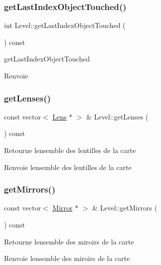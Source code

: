 \subsubsection{\texorpdfstring{getLastIndexObjectTouched()}{getLastIndexObjectTouched()}}
{\footnotesize\ttfamily int Level\+::get\+Last\+Index\+Object\+Touched (\begin{DoxyParamCaption}{ }\end{DoxyParamCaption}) const}



get\+Last\+Index\+Object\+Touched 

\begin{DoxyReturn}{Renvoie}

\end{DoxyReturn}
\mbox{\label{class_level_a38b9b969eb86aaea2824666960f797b7}} 
\subsubsection{\texorpdfstring{getLenses()}{getLenses()}}
{\footnotesize\ttfamily const vector$<$ \mbox{\hyperlink{class_lens}{Lens}} $\ast$ $>$ \& Level\+::get\+Lenses (\begin{DoxyParamCaption}{ }\end{DoxyParamCaption}) const}

Retourne l\textquotesingle{}ensemble des lentilles de la carte \begin{DoxyReturn}{Renvoie}
l\textquotesingle{}ensemble des lentilles de la carte 
\end{DoxyReturn}
\mbox{\label{class_level_a125da7c8f85b5fc14172dbe924dc2255}} 
\subsubsection{\texorpdfstring{getMirrors()}{getMirrors()}}
{\footnotesize\ttfamily const vector$<$ \mbox{\hyperlink{class_mirror}{Mirror}} $\ast$ $>$ \& Level\+::get\+Mirrors (\begin{DoxyParamCaption}{ }\end{DoxyParamCaption}) const}

Retourne l\textquotesingle{}ensemble des miroirs de la carte \begin{DoxyReturn}{Renvoie}
l\textquotesingle{}ensemble des miroirs de la carte 
\end{DoxyReturn}
\mbox{\label{class_level_af3d73dcf1b986955c2244da45590462d}} 
